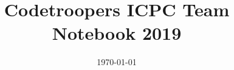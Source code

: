 \documentclass[10pt]{article}
\title{\vspace{-6ex}\Large{Codetroopers ICPC Team Notebook 2019}}
\date{\today}
\begin{document}
\begin{landscape}
\begin{multicols}{2}

\maketitle
\tableofcontents
\pagestyle{fancy}

\newpage


\end{multicols}
\end{landscape}
\end{document}
